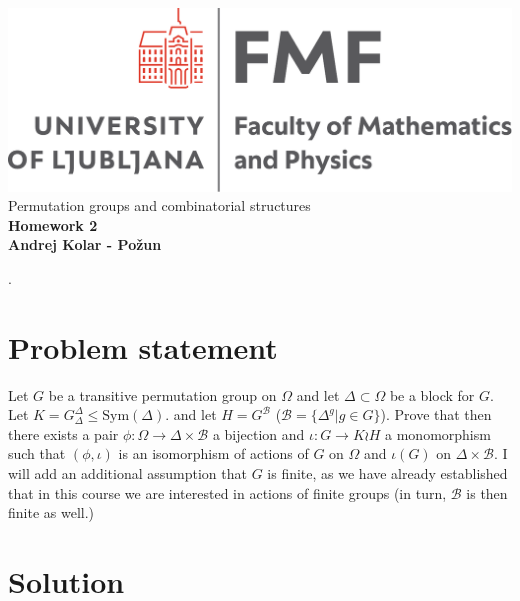 \documentclass{article}
\begin{document}
\begin{titlepage}
    \begin{center}
        \vspace*{1cm}
        \Large
\includegraphics[width=.8\linewidth]{slike/fmflogo.pdf}\\
        \Large
\vspace{3cm}
        Permutation groups and combinatorial structures\\
        \huge
        \textbf{Homework 2\\}
\Large  
        \vspace{1cm}
        \textbf{Andrej Kolar - Po{\v z}un\\}


\vfill
\normalsize
\end{center}. 
\end{titlepage}
\newpage
{}
\section*{Problem statement}
Let $G$ be a transitive permutation group on $\Omega$ and let $\Delta \subset \Omega$ be a block for $G$. Let $K = G_\Delta^\Delta \leq \mathrm{Sym}(\Delta)$. and let $H = G^\mathcal{B}$ ($\mathcal{B} = \{ \Delta^g | g \in G \}$). Prove that then there exists a pair $\phi: \Omega \to \Delta \times \mathcal{B}$ a bijection and $\iota: G \to K \wr H$ a monomorphism such that $(\phi,\iota)$ is an isomorphism of actions of $G$ on $\Omega$ and $\iota(G)$ on $\Delta \times \mathcal{B}$.
I will add an additional assumption that $G$ is finite, as we have already established that in this course we are interested in actions of finite groups (in turn, $\mathcal{B}$ is then finite as well.)
\section*{Solution}
\end{document}
